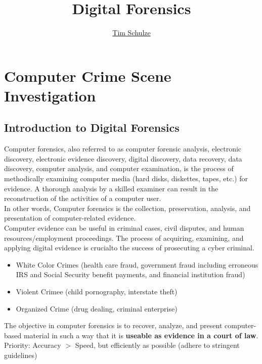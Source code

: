 \documentclass{scrreprt}
\title{\textbf{Digital Forensics}}
\author{\href{https://www.instagram.com/timds21/}{\color{black}Tim Schulze}}
\date{}
\begin{document}
\maketitle
\pagebreak
\renewcommand{\contentsname}{Inhaltsverzeichnis}
\setcounter{tocdepth}{1}
\tableofcontents
{}
\pagebreak
{}


\chapter{Computer Crime Scene Investigation}

\section{Introduction to Digital Forensics}
Computer forensics, also referred to as computer forensic analysis, electronic discovery, electronic evidence discovery, digital discovery, data recovery, data discovery, computer analysis, and computer examination, is the process of methodically examining computer media (hard disks, diskettes, tapes, etc.) for evidence. A thorough analysis by a skilled examiner can result in the reconstruction of the activities of a computer user.
\\In other words, Computer forensics is the collection, preservation, analysis, and presentation of computer-related evidence. 
\\Computer evidence can be useful in criminal cases, civil disputes, and human resources/employment proceedings.
The process of acquiring, examining, and applying digital evidence is crucialto the success of prosecuting a cyber criminal.
\begin{itemize}
\item White Color Crimes (health care fraud, government fraud including erroneous IRS and Social Security benefit payments, and financial institution fraud)
\item Violent Crimee (child pornography, interstate theft)
\item Organized Crime (drug dealing, criminal enterprise)
\end{itemize}
The objective in computer forensics is to recover, analyze, and present computer-based material in such a way that it is \textbf{useable as evidence in a court of law}. 
\\Priority: Accuracy $>$ Speed, but efficiently as possible (adhere to stringent guidelines)
\end{document}
